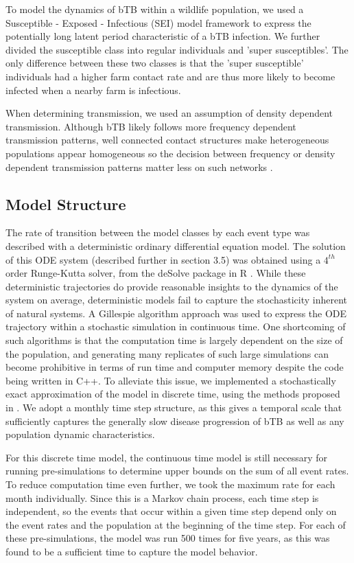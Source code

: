 \documentclass[number,preprint,review,12pt]{elsarticle}
\begin{document}
To model the dynamics of bTB within a wildlife population, we used a Susceptible - Exposed - Infectious (SEI) model framework to express the potentially long latent period characteristic of a bTB infection. \citep{brooks-pollock} We further divided the susceptible class into regular individuals and 'super susceptibles'. The only difference between these two classes is that the 'super susceptible' individuals had a higher farm contact rate and are thus more likely to become infected when a nearby farm is infectious.

When determining transmission, we used an assumption of density dependent transmission. Although bTB likely follows more frequency dependent transmission patterns, well connected contact structures make heterogeneous populations appear homogeneous so the decision between frequency or density dependent transmission patterns matter less on such networks \citep{begon}.  

\subsection{Model Structure}
\doublespacing
The rate of transition between the model classes by each event type was described with a deterministic ordinary differential equation model. The solution of this ODE system (described further in section 3.5) was obtained using a $4^{th}$ order Runge-Kutta solver, from the deSolve package in R \citep{deSolve}. While these deterministic trajectories do provide reasonable insights to the dynamics of the system on average, deterministic models fail to capture the stochasticity inherent of natural systems. A Gillespie algorithm approach was used to express the ODE trajectory within a stochastic simulation in continuous time. One shortcoming of such algorithms is that the computation time is largely dependent on the size of the population, and generating many replicates of such large simulations can become prohibitive in terms of run time and computer memory despite the code being written in C++. To alleviate this issue, we implemented a stochastically exact approximation of the model in discrete time, using the methods proposed in \citet{SANDMANN}. We adopt a monthly time step structure, as this gives a temporal scale that sufficiently captures the generally slow disease progression of bTB as well as any population dynamic characteristics. 

For this discrete time model, the continuous time model is still necessary for running pre-simulations to determine upper bounds on the sum of all event rates. To reduce computation time even further, we took the maximum rate for each month individually. Since this is a Markov chain process, each time step is independent, so the events that occur within a given time step depend only on the event rates and the population at the beginning of the time step. For each of these pre-simulations, the model was run 500 times for five years, as this was found to be a sufficient time to capture the model behavior.  
\end{document}
